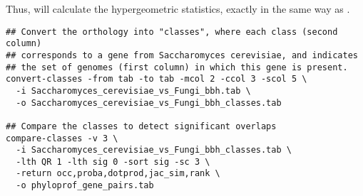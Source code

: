Thus,  will calculate the hypergeometric
statistics, exactly in the same way as . 

\begin{footnotesize}
\begin{verbatim}
## Convert the orthology into "classes", where each class (second column)
## corresponds to a gene from Saccharomyces cerevisiae, and indicates 
## the set of genomes (first column) in which this gene is present. 
convert-classes -from tab -to tab -mcol 2 -ccol 3 -scol 5 \
  -i Saccharomyces_cerevisiae_vs_Fungi_bbh.tab \
  -o Saccharomyces_cerevisiae_vs_Fungi_bbh_classes.tab

## Compare the classes to detect significant overlaps
compare-classes -v 3 \
  -i Saccharomyces_cerevisiae_vs_Fungi_bbh_classes.tab \
  -lth QR 1 -lth sig 0 -sort sig -sc 3 \
  -return occ,proba,dotprod,jac_sim,rank \
  -o phyloprof_gene_pairs.tab
\end{verbatim}
\end{footnotesize}
